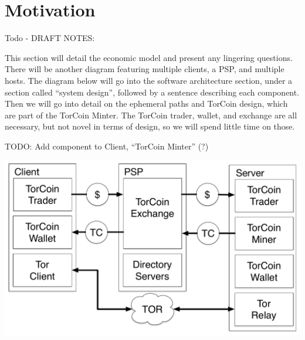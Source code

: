 \section{Motivation} \label{motivation}

Todo - DRAFT NOTES:

This section will detail the economic model and present any lingering questions. There will be another diagram featuring multiple clients, a PSP, and multiple hosts. The diagram below will go into the software architecture section, under a section called ``system design'', followed by a sentence describing each component. Then we will go into detail on the ephemeral paths and TorCoin design, which are part of the TorCoin Minter. The TorCoin trader, wallet, and exchange are all necessary, but not novel in terms of design, so we will spend little time on those.

TODO: Add component to Client, ``TorCoin Minter'' (?)

\includegraphics[scale=0.5]{figures/overview.pdf}